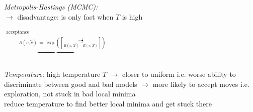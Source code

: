     \emph{Metropolis-Hastings (MCMC):}\\
    $\to$ disadvantage: is only fast when $T$ is high\\
    \begin{minipage}{\linewidth}
        \begin{minipage}{\linewidth}
            \vspace{-75pt}
            \hspace*{58pt}
            $\overbrace{
                \phantom{a\qquad\qquad\!\! a)}
            }^{
                \substack{
                    \text{acceptance}\\
                    \hspace{30pt}
                    A(c,\tilde c) \,=\, \exp(-\frac1T \brack{ R(\tilde c, X) - R(c,X)})
                }
            }$
        \end{minipage}
    \end{minipage}
\fi

\emph{Temperature:}
high temperature $T$ $\to$ closer to uniform i.e. worse ability to discriminate between good and bad  models $\to$ more likely to accept moves i.e. exploration, not stuck in bad local minima\\
reduce temperature to find better local minima and get stuck there

